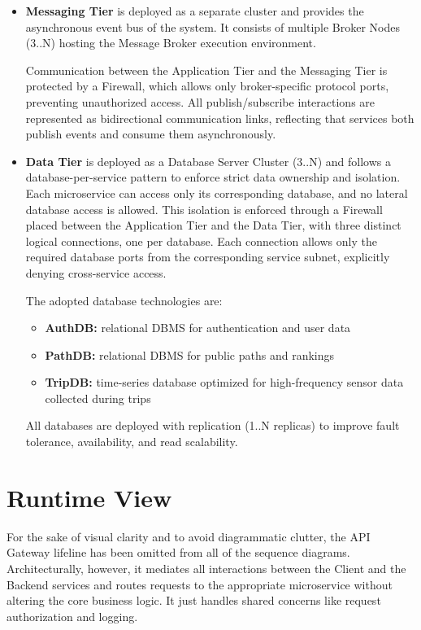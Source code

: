 \begin{itemize}
    \item \textbf{Messaging Tier} is deployed as a separate cluster and provides the asynchronous event bus of the system. It consists of multiple Broker Nodes (3..N) hosting the Message Broker execution environment.
    
    Communication between the Application Tier and the Messaging Tier is protected by a Firewall, which allows only broker-specific protocol ports, preventing unauthorized access. All publish/subscribe interactions are represented as bidirectional communication links, reflecting that services both publish events and consume them asynchronously.
    
    \item \textbf{Data Tier} is deployed as a Database Server Cluster (3..N) and follows a database-per-service pattern to enforce strict data ownership and isolation. Each microservice can access only its corresponding database, and no lateral database access is allowed. This isolation is enforced through a Firewall placed between the Application Tier and the Data Tier, with three distinct logical connections, one per database. Each connection allows only the required database ports from the corresponding service subnet, explicitly denying cross-service access.
    
    The adopted database technologies are:
    \begin{itemize}
        \item \textbf{AuthDB:} relational DBMS for authentication and user data
        \item \textbf{PathDB:} relational DBMS for public paths and rankings
        \item \textbf{TripDB:} time-series database optimized for high-frequency sensor data collected during trips
    \end{itemize}
    
    All databases are deployed with replication (1..N replicas) to improve fault tolerance, availability, and read scalability.
\end{itemize}

\section{Runtime View}
\label{sec:runtime-view}
For the sake of visual clarity and to avoid diagrammatic clutter, the API Gateway lifeline has been omitted from all of the sequence diagrams. Architecturally, however, it mediates all interactions between the Client and the Backend services and routes requests to the appropriate microservice without altering the core business logic. It just handles shared concerns like request authorization and logging.

